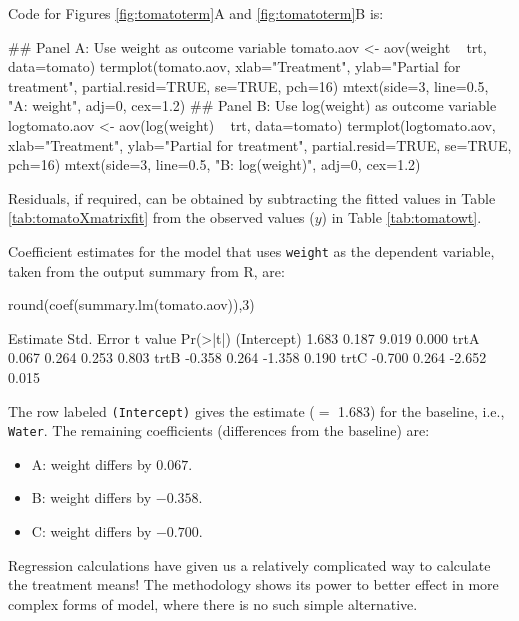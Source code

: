 \documentclass{tufte-book}\usepackage[]{graphicx}\usepackage[]{color}
\newcommand{\txtt}[1]{\texttt{#1}}
\begin{document}
\noindent
Code for Figures \ref{fig:tomatoterm}A and \ref{fig:tomatoterm}B is:
\begin{Schunk}
\begin{Sinput}
## Panel A: Use weight as outcome variable
tomato.aov <- aov(weight ~ trt, data=tomato)
termplot(tomato.aov, xlab="Treatment",
         ylab="Partial for treatment",
         partial.resid=TRUE, se=TRUE, pch=16)
mtext(side=3, line=0.5, "A: weight", adj=0, cex=1.2)
## Panel B: Use log(weight) as outcome variable
logtomato.aov <- aov(log(weight) ~ trt, data=tomato)
termplot(logtomato.aov, xlab="Treatment",
         ylab="Partial for treatment",
         partial.resid=TRUE, se=TRUE, pch=16)
mtext(side=3, line=0.5, "B: log(weight)", adj=0,
      cex=1.2)
\end{Sinput}
\end{Schunk}

Residuals, if required, can be obtained by subtracting the
fitted values in Table \ref{tab:tomatoXmatrixfit} from the observed
values ($y$) in Table \ref{tab:tomatowt}.

Coefficient estimates for the model that uses \txtt{weight} as the
dependent variable, taken from the output summary from R, are:

\begin{Schunk}
\begin{Sinput}
round(coef(summary.lm(tomato.aov)),3)
\end{Sinput}
\begin{Soutput}
            Estimate Std. Error t value Pr(>|t|)
(Intercept)    1.683      0.187   9.019    0.000
trtA           0.067      0.264   0.253    0.803
trtB          -0.358      0.264  -1.358    0.190
trtC          -0.700      0.264  -2.652    0.015
\end{Soutput}
\end{Schunk}

The row labeled \verb!(Intercept)! gives the estimate ($=$ 1.683) for
the baseline, i.e., \verb!Water!.  The remaining coefficients
(differences from the baseline) are:\vspace*{-2pt}
\begin{itemize}
\leftskip-1.3pt
\item[ ]A: weight differs by $0.067$.
\item[ ]B: weight differs by $-0.358$.
\item[ ]C: weight differs by $-0.700$.
\vspace*{-2pt}
\end{itemize}%
Regression calculations have given
us a relatively complicated way to calculate the treatment means!
The methodology shows its power to better effect in more complex
forms of model, where there is no such simple alternative.
\end{document}
